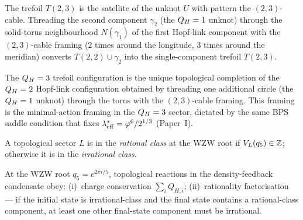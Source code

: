 \begin{proposition}
\label{P18:prop:satellite}
The trefoil $T(2,3)$ is the satellite of the unknot $U$ with pattern
the $(2,3)$-cable. Threading the second component $\gamma_2$ (the
$Q_H=1$ unknot) through the solid-torus neighbourhood $N(\gamma_1)$
of the first Hopf-link component with the $(2,3)$-cable framing
($2$ times around the longitude, $3$ times around the meridian)
converts $T(2,2)\cup\gamma_2$ into the single-component trefoil
$T(2,3)$.
\end{proposition}

\begin{remark}
\label{P18:rem:satellite_physical}
The $Q_H=3$ trefoil configuration is the unique topological
completion of the $Q_H=2$ Hopf-link configuration obtained by
threading one additional circle (the $Q_H=1$ unknot) through the
torus with the $(2,3)$-cable framing. This framing is the
minimal-action framing in the $Q_H=3$ sector, dictated by the same
BPS saddle condition that fixes $\lambda_{\rm eff}^*=\varphi^6/2^{1/3}$
(Paper~I).
\end{remark}

\begin{definition}
\label{P18:def:rational_class}
A topological sector $L$ is in the \emph{rational class} at the WZW
root if $V_L(q_5)\in\mathbb{Z}$; otherwise it is in the
\emph{irrational class}.
\end{definition}

\begin{theorem}
\label{P18:thm:jones_rule}
At the WZW root $q_5=e^{2\pi i/5}$, topological reactions in the
density-feedback condensate obey: (i)~charge conservation
$\sum_i Q_{H,i}$; (ii)~rationality factorisation --- if the initial
state is irrational-class and the final state contains a
rational-class component, at least one other final-state component
must be irrational.
\end{theorem}

